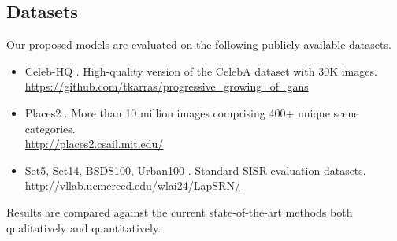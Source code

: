 \documentclass[10pt,twocolumn,letterpaper]{article}
\begin{document}
\subsection{Datasets}
Our proposed models are evaluated on the following publicly available datasets. 

\begin{itemize}
	\item Celeb-HQ \cite{karras2018progressive}. High-quality version of the CelebA dataset with 30K images. \\ \url{https://github.com/tkarras/progressive_growing_of_gans}
	
	\item Places2 \cite{zhou2017places}. More than 10 million images comprising 400+ unique scene categories. \\ \url{http://places2.csail.mit.edu/}
	
	\item Set5, Set14, BSDS100, Urban100 \cite{huang2015single}. Standard SISR evaluation datasets. \\ \url{http://vllab.ucmerced.edu/wlai24/LapSRN/}
\end{itemize}
\noindent
Results are compared against the current state-of-the-art methods both qualitatively and quantitatively.
\end{document}
